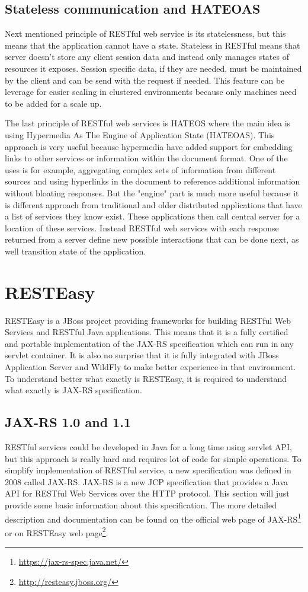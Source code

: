 \documentclass[12pt,final,oneside]{fithesis2}
\begin{document}
\subsection*{Stateless communication and HATEOAS}
Next mentioned principle of RESTful web service is its statelessness, but this means that the application cannot have a state. Stateless in RESTful means that server doesn't store any client session data and instead only manages states of resources it exposes. Session specific data, if they are needed, must be maintained by the client and can be send with the request if needed. This feature can be leverage for easier scaling in clustered environments because only machines need to be added for a scale up. 

The last principle of RESTful web services is HATEOS where the main idea is using Hypermedia As The Engine of Application State (HATEOAS). This approach is very useful because hypermedia have added support for embedding links to other services or information within the document format. One of the uses is for example, aggregating complex sets of information from different sources and using hyperlinks in the document to reference additional information without bloating responses. But the "engine" part is much more useful because it is different approach from traditional and older distributed applications that have a list of services they know exist. These applications then call central server for a location of these services. Instead RESTful web services with each response returned from a server define new possible interactions that can be done next, as well transition state of the application.

\section{RESTEasy}
RESTEasy is a JBoss project providing frameworks for building RESTful Web Services and RESTful Java applications. This means that it is a fully certified and portable implementation of the JAX-RS specification which can run in any servlet container. It is also no surprise that it is fully integrated with JBoss Application Server and WildFly to make better experience in that environment. To understand better what exactly is RESTEasy, it is required to understand what exactly is JAX-RS specification.\cite{resteasy-doc}

 
\subsection{JAX-RS 1.0 and 1.1}
RESTful services could be developed in Java for a long time using servlet API, but this approach is really hard and requires lot of code for simple operations. To simplify implementation of RESTful service, a new specification was defined in 2008 called JAX-RS. JAX-RS is a new JCP specification that provides a Java API for RESTful Web Services over the HTTP protocol. This section will just provide some basic information about this specification. The more detailed description and documentation can be found on the official web page of JAX-RS\footnote{\url{https://jax-rs-spec.java.net/}} or on RESTEasy web page\footnote{\url{http://resteasy.jboss.org/}}. 
\end{document}
